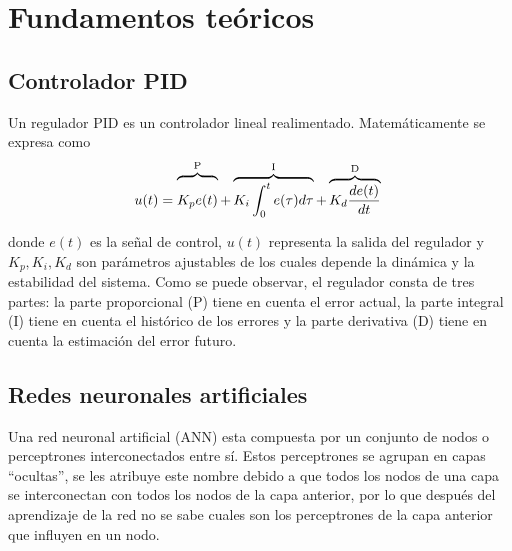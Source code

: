 \chapter{Fundamentos teóricos}







\section{Controlador PID}




Un regulador PID es un controlador lineal realimentado. Matemáticamente se expresa como 
\begin{equation}
	u(t) = \overbrace{\raisebox{0ex}[2.2\height]{$K_p e(t)$}}^\text{P} +\overbrace{K_i \int_{0}^{t}e(\tau)d\tau}^\text{I} + \overbrace{ K_d \frac{de(t)}{dt}}^\text{D}\;
\end{equation}

donde $e(t)$ es la señal de control, $u(t)$ representa la salida del regulador y $K_p,K_i,K_d$ son parámetros ajustables de los cuales depende la dinámica y la estabilidad del sistema. Como se puede observar, el regulador consta de tres partes: la parte proporcional (P) tiene en cuenta el error actual, la parte integral (I) tiene en cuenta el histórico de los errores y la parte derivativa (D) tiene en cuenta la estimación del error futuro.
\section{Redes neuronales artificiales} 
 Una red neuronal artificial (ANN) esta compuesta por un conjunto de nodos o perceptrones interconectados entre sí. Estos perceptrones se agrupan en capas ``ocultas'', se les atribuye este nombre debido a que todos los nodos de una capa se interconectan con todos los nodos de la capa anterior, por lo que después del aprendizaje de la red no se sabe cuales son los perceptrones de la capa anterior que influyen en un nodo.
 
